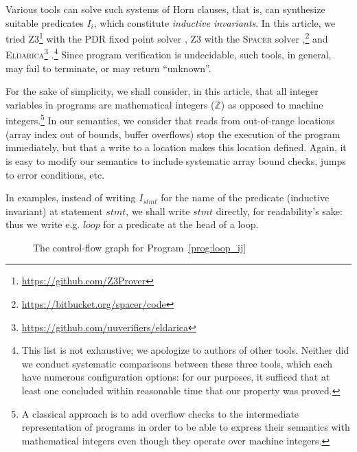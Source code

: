 \documentclass[a4paper]{article}
\newcommand{\ZZ}{\mathbb{Z}}
\newcommand{\soft}[1]{\textsc{#1}}
\theoremstyle{definition}
\theoremstyle{plain}
\begin{document}
Various tools can solve such systems of Horn clauses, that is, can synthesize suitable predicates $I_i$, which constitute \emph{inductive invariants}.
In this article, we tried \soft{Z3}\footnote{\url{https://github.com/Z3Prover}}
with the \soft{PDR} fixed point solver \cite{DBLP:conf/sat/HoderB12},
Z3 with the \soft{Spacer} solver \cite{DBLP:conf/cav/KomuravelliGCC13,DBLP:conf/cav/KomuravelliGC14},\footnote{\url{https://bitbucket.org/spacer/code}}
and \soft{Eldarica}\footnote{\url{https://github.com/uuverifiers/eldarica}}
\cite{DBLP:conf/cav/RummerHK13}.\footnote{This list is not exhaustive; we apologize to authors of other tools.
Neither did we conduct systematic comparisons between these three tools, which each have numerous configuration options:
for our purposes, it sufficed that at least one concluded within reasonable time that our property was proved.}
Since program verification is undecidable, such tools, in general, may fail to terminate, or may return ``unknown''.

For the sake of simplicity, we shall consider, in this article, that all integer variables in programs are mathematical integers ($\ZZ$) as opposed to machine integers.\footnote{A classical approach is to add overflow checks to the intermediate representation of programs in order to be able to express their semantics with mathematical integers even though they operate over machine integers.}
In our semantics, we consider that reads from out-of-range locations (array index out of bounds, buffer overflows) stop the execution of the program immediately, but that a write to a location makes this location defined.
Again, it is easy to modify our semantics to include systematic array bound checks, jumps to error conditions, etc.

In examples, instead of writing $I_{\mathit{stmt}}$ for the name of the predicate (inductive invariant) at statement $\mathit{stmt}$, we shall write $\mathit{stmt}$ directly, for readability's sake: thus we write e.g. $\mathit{loop}$ for a predicate at the head of a loop.

\begin{figure}
\begin{center}
\end{center}

\caption{The control-flow graph for Program~\ref{prog:loop_ij}}
\label{fig:loop_ij}
\end{figure}
\end{document}

